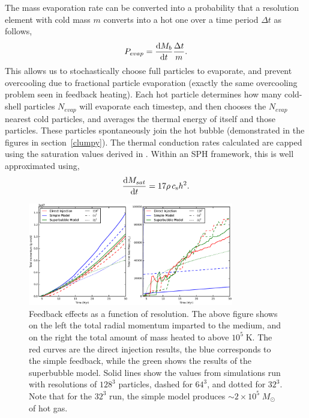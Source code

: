 The mass evaporation rate can be converted into a probability that a resolution
element with cold mass $m$ converts into a hot one over a time
period $\Delta t$ as follows, 
\begin{equation}\label{evaporation_probability}
    P_{evap} = \frac{{\rm d}M_b}{{\rm d}t} \frac{\Delta t}{m}.
\end{equation}
This allows us to stochastically choose full particles to evaporate, and prevent
overcooling due to fractional particle evaporation (exactly the same overcooling
problem seen in feedback heating).  Each hot particle determines how many
cold-shell particles $N_{evap}$ will evaporate each timestep, and then chooses
the $N_{evap}$ nearest cold particles, and averages the thermal energy of itself
and those particles.  These particles spontaneously join the hot bubble
(demonstrated in the figures in section~\ref{clumpy}).  The thermal conduction
rates calculated are capped using the saturation values derived in
\citet{Cowie1977}.  Within an SPH framework, this is well approximated using,
\begin{equation}\label{saturation_rate}
    \frac{{\rm d}M_{sat}}{{\rm d}t} = 17\rho\,c_{\rm s} h^2.
\end{equation}

\begin{figure}
    \includegraphics[width=0.8\textwidth]{figures1/onestar_homogeneous.eps}
    \caption[Feedback effects as a function of resolution]{Feedback effects as a
    function of resolution.  The above figure shows on the left the total radial
    momentum imparted to the medium, and on the right the total amount of mass
    heated to above $10^5\;\mathrm{K}$.  The red curves are the direct injection
    results, the blue corresponds to the simple feedback, while the green shows
    the results of the superbubble model.  Solid lines show the values from
    simulations run with resolutions of $128^3$ particles, dashed for $64^3$,
    and dotted for $32^3$.  Note that for the $32^3$ run, the simple model
    produces $\sim 2\times 10^5\;M_\odot$ of hot gas.}
    \label{onestar_homogeneous}
\end{figure}

